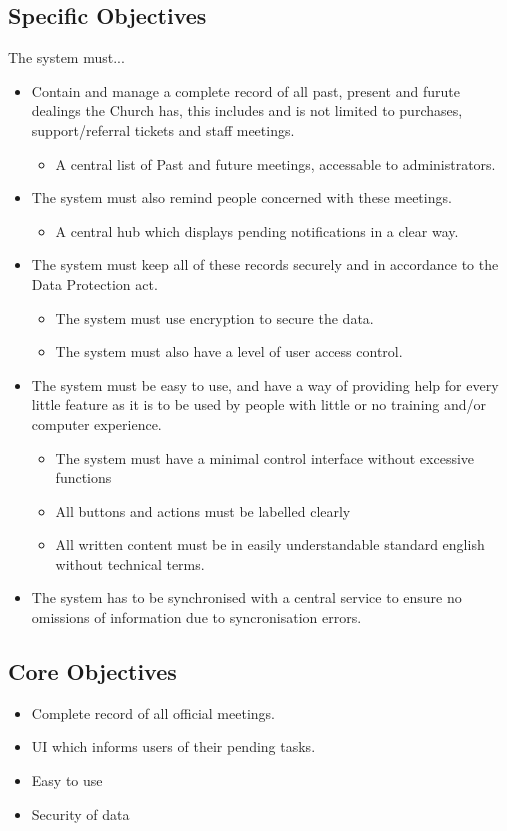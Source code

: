 \subsection{Specific Objectives}
	The system must...
	\begin{itemize}
		\item Contain and manage a complete record of all past, present and furute dealings the Church has, this includes and is not limited to purchases, support/referral tickets and staff meetings.
		\begin{itemize}
				\item A central list of Past and future meetings, accessable to administrators.
		\end{itemize}
		\item The system must also remind people concerned with these meetings.
		\begin{itemize}
				\item A central hub which displays pending notifications in a clear way.
		\end{itemize}
		\item The system must keep all of these records securely and in accordance to the Data Protection act.
		\begin{itemize}
			\item The system must use encryption to secure the data.
			\item The system must also have a level of user access control.
		\end{itemize}
		\item The system must be easy to use, and have a way of providing help for every little feature as it is to be used by people with little or no training and/or computer experience.
		\begin{itemize}
			\item The system must have a minimal control interface without excessive functions
			\item All buttons and actions must be labelled clearly
			\item All written content must be in easily understandable standard english without technical terms.
		\end{itemize}
		\item The system has to be synchronised with a central service to ensure no omissions of information due to syncronisation errors.
	\end{itemize}

\subsection{Core Objectives}
	\begin{itemize}
		\item Complete record of all official meetings.
		\item UI which informs users of their pending tasks.
		\item Easy to use
		\item Security of data
	\end{itemize}

